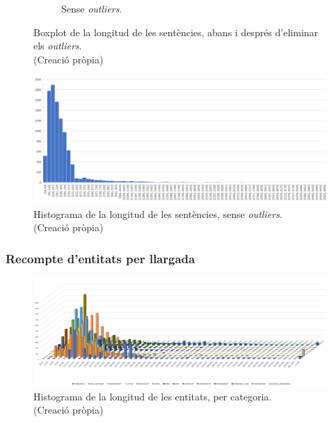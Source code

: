 \begin{figure}[h]
\begin{subfigure}{.5\textwidth}
    \caption{Sense \textit{outliers}.}
    \label{fig:box_longitud_sentencies_out}
  \end{subfigure}
  \caption[Boxplot de la longitud de les sentències]{Boxplot de la longitud de les sentències, abans i després d'eliminar els \textit{outliers}. \\ (Creació pròpia)}
  \label{fig:box_longitud_sentencies}
\end{figure}

\begin{figure}[H]
  \centering
  \includegraphics[width=\textwidth]{hist_sent_out.png}
  \caption[Histograma de la longitud de les sentències]{Histograma de la longitud de les sentències, sense \textit{outliers}. \\ (Creació pròpia)}
  \label{fig:histograma_sentencies_out}
\end{figure}


\subsubsection{Recompte d'entitats per llargada}
\begin{figure}[H]
  \centering
  \includegraphics[width=\textwidth]{hist_ent_categoria.png}
  \caption[Histograma de la longitud de les entitats, per categoria]{Histograma de la longitud de les entitats, per categoria. \\ (Creació pròpia)}
  \label{fig:histograma_entitats_tipus}
\end{figure}

